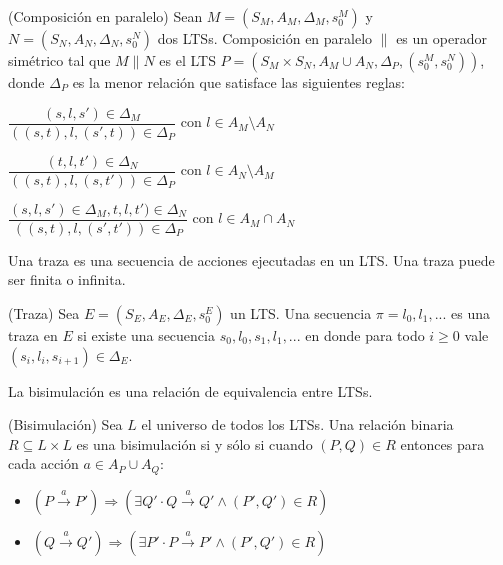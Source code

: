 \begin{definition}{(Composición en paralelo)}
Sean $M = (S_{M}, A_{M}, \Delta_{M}, s_{0}^{M})$ y\\
$N = (S_{N}, A_{N}, \Delta_{N}, s_{0}^{N})$ dos LTSs. Composición en paralelo $\parallel$ es un operador simétrico tal que 
$M \parallel N$ es el LTS $P = (S_{M} \times S_{N}, A_{M} \cup A_{N}, \Delta_{P}, (s_{0}^{M}, s_{0}^{N}))$, donde $\Delta_{P}$ es 
la menor relación que satisface las siguientes reglas:
\begin{center}
\vspace{\baselineskip}
$\dfrac{(s, l, s') \in \Delta_{M}}{((s, t), l, (s', t)) \in \Delta_{P}}$ con $l \in A_{M} \setminus A_{N}$

\vspace{\baselineskip}
$\dfrac{(t, l, t') \in \Delta_{N}}{((s, t), l, (s, t')) \in \Delta_{P}}$ con $l \in A_{N} \setminus A_{M}$

\vspace{\baselineskip}
$\dfrac{(s, l, s') \in \Delta_{M}, t, l, t') \in \Delta_{N}}{((s, t), l, (s', 
t')) \in \Delta_{P}}$ con $l \in A_{M} \cap A_{N}$
\end{center}
\end{definition}


Una traza es una secuencia de acciones ejecutadas en un LTS. Una traza puede 
ser finita o infinita.

\begin{definition}{(Traza)}
Sea $E = (S_{E}, A_{E}, \Delta_{E}, s_{0}^{E})$ un LTS. Una secuencia $\pi = 
l_{0}, l_{1}, ...$ es una traza en $E$ si existe una 
secuencia $s_{0}, l_{0}, s_{1}, l_{1}, ...$ en donde para todo $i \geq 0$ vale 
$(s_{i}, l_{i}, s_{i + 1}) \in \Delta_{E}$.
\end{definition}

La bisimulación es una relación de equivalencia entre LTSs.

\begin{definition}{(Bisimulación)}
Sea $L$ el universo de todos los LTSs. Una relación binaria $R \subseteq L 
\times L$ es una bisimulación si y sólo si cuando  
$(P, Q) \in R$ entonces para cada acción $a \in A_{P} \cup A_{Q}$:

\begin{itemize}

\item
$(P \xrightarrow{a} P') \Rightarrow (\exists Q' \cdot Q \xrightarrow{a} Q' 
\land (P', Q') \in R)$

\item
$(Q \xrightarrow{a} Q') \Rightarrow (\exists P' \cdot P \xrightarrow{a} P' 
\land (P', Q') \in R)$

\end{itemize}

\end{definition}



